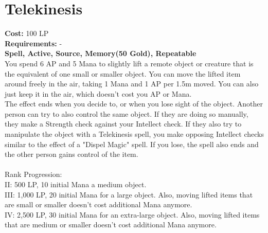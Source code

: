 \section{Telekinesis}\label{spell:telekinesis}
\textbf{Cost:} 100 LP\\
\textbf{Requirements:} -\\
\textbf{Spell, Active, Source, Memory(50 Gold), Repeatable}\\
You spend 6 AP and 5 Mana to slightly lift a remote object or creature that is the equivalent of one small or smaller object.
You can move the lifted item around freely in the air, taking 1 Mana and 1 AP per 1.5m moved.
You can also just keep it in the air, which doesn't cost you AP or Mana.\\
The effect ends when you decide to, or when you lose sight of the object.
Another person can try to also control the same object.
If they are doing so manually, they make a Strength check against your Intellect check.
If they also try to manipulate the object with a Telekinesis spell, you make opposing Intellect checks similar to the effect of a "Dispel Magic" spell.
If you lose, the spell also ends and the other person gains control of the item.\\
\\
Rank Progression:\\
II: 500 LP, 10 initial Mana a medium object.\\

III: 1,000 LP, 20 initial Mana for a large object.
Also, moving lifted items that are small or smaller doesn't cost additional Mana anymore.\\

IV: 2,500 LP, 30 initial Mana for an extra-large object.
Also, moving lifted items that are medium or smaller doesn't cost additional Mana anymore.